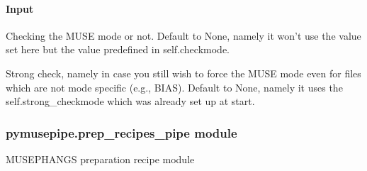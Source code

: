 \documentclass[letterpaper,10pt,english]{sphinxmanual}
\begin{document}
\begin{fulllineitems}
\begin{fulllineitems}
\paragraph{Input}
\label{\detokenize{api/pymusepipe:id104}}\begin{description}
\sphinxAtStartPar
Checking the MUSE mode or not. Default to None, namely it won’t use
the value set here but the value predefined in self.checkmode.

\sphinxAtStartPar
Strong check, namely in case you still wish to force the MUSE mode
even for files which are not mode specific (e.g., BIAS).
Default to None, namely it uses the self.strong\_checkmode which was
already set up at start.

\end{description}

\end{fulllineitems}


\end{fulllineitems}



\subsubsection{pymusepipe.prep\_recipes\_pipe module}
\label{\detokenize{api/pymusepipe:module-pymusepipe.prep_recipes_pipe}}\label{\detokenize{api/pymusepipe:pymusepipe-prep-recipes-pipe-module}}
\sphinxAtStartPar
MUSE\sphinxhyphen{}PHANGS preparation recipe module
\end{document}
